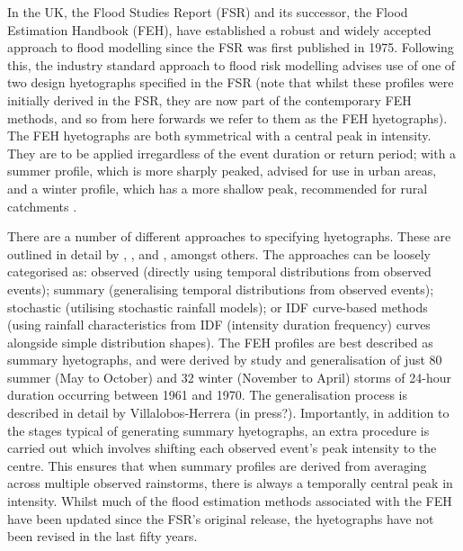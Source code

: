 \documentclass[APA,Times2COL]{WileyNJDv5}
\begin{document}
In the UK, the Flood Studies Report (FSR) and its successor, the Flood Estimation Handbook (FEH), have established a robust and widely accepted approach to flood modelling since the FSR was first published in 1975. Following this, the industry standard approach to flood risk modelling advises use of one of two design hyetographs specified in the FSR (note that whilst these profiles were initially derived in the FSR, they are now part of the contemporary FEH methods, and so from here forwards we refer to them as the FEH hyetographs). The FEH hyetographs are both symmetrical with a central peak in intensity. They are to be applied irregardless of the event duration or return period; with a summer profile, which is more sharply peaked, advised for use in urban areas, and a winter profile, which has a more shallow peak, recommended for rural catchments \citep{faulkner1999}. 


There are a number of different approaches to specifying hyetographs. These are outlined in detail by \citet{chow1988applied}, \citet{veneziano1999best}, and \citet{balbastre2019comparison}, amongst others. The approaches can be loosely categorised as: observed (directly using temporal distributions from observed events); summary (generalising temporal distributions from observed events); stochastic (utilising stochastic rainfall models); or IDF curve-based methods (using rainfall characteristics from IDF (intensity duration frequency) curves alongside simple distribution shapes). The FEH profiles are best described as summary hyetographs, and were derived by study and generalisation of just 80 summer (May to October) and 32 winter (November to April) storms of 24-hour duration occurring between 1961 and 1970. The generalisation process is described in detail by Villalobos-Herrera (in press?). Importantly, in addition to the stages typical of generating summary hyetographs, an extra procedure is carried out which involves shifting each observed event's peak intensity to the centre. This ensures that when summary profiles are derived from averaging across multiple observed rainstorms, there is always a temporally central peak in intensity. Whilst much of the flood estimation methods associated with the FEH have been updated since the FSR's original release, the hyetographs have not been revised in the last fifty years. 
\end{document}
